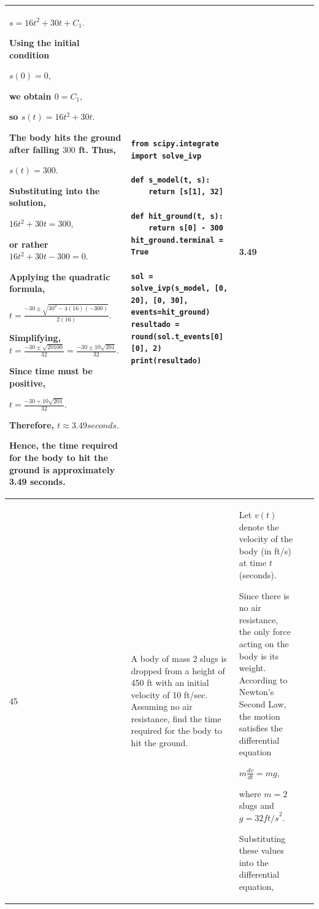 \documentclass[a4paper,12pt]{article}
\begin{document}
\begin{longtable}{|p{0.3cm}|p{}|p{10cm}|p{}|p{1.5cm}|}
$s=16t^2+30t+C_1.$

Using the initial condition

$s(0)=0,$

we obtain $0=C_1,$

so $s(t)=16t^2+30t.$

The body hits the ground after falling $300$ ft. Thus,

$s(t)=300.$

Substituting into the solution,

$16t^2+30t=300,$

or rather $16t^2+30t-300=0.$

Applying the quadratic formula,

$t=\frac{-30\pm\sqrt{30^2-4(16)(-300)}}{2(16)}.$

Simplifying,$t=\frac{-30\pm\sqrt{20100}}{32}=\frac{-30\pm10\sqrt{201}}{32}.$

Since time must be positive,

$t=\frac{-30+10\sqrt{201}}{32}.$

Therefore, $t\approx3.49{ seconds}.$

Hence, the time required for the body to hit the ground is
approximately 3.49  seconds.
&\begin{verbatim}
from scipy.integrate import solve_ivp

def s_model(t, s):
    return [s[1], 32]

def hit_ground(t, s):
    return s[0] - 300
hit_ground.terminal = True

sol = solve_ivp(s_model, [0, 20], [0, 30], events=hit_ground)
resultado = round(sol.t_events[0][0], 2)
print(resultado)
\end{verbatim}&  3.49 \\ \hline

45            &A body of mass 2 slugs is dropped from a height of 450 ft with an initial velocity of 10 ft/sec. Assuming no air resistance, find the time required for the body to hit the ground.


              & Let $v(t)$ denote the velocity of the body (in ft/s) at time $t$ (seconds).

Since there is no air resistance, the only force acting on the body is its weight. According to Newton's Second Law, the motion satisfies the differential equation

$m\frac{dv}{dt}=mg,$

where $m=2$ slugs and $g=32{ ft/s}^2$.

Substituting these values into the differential equation,


\end{longtable}
\end{document}
